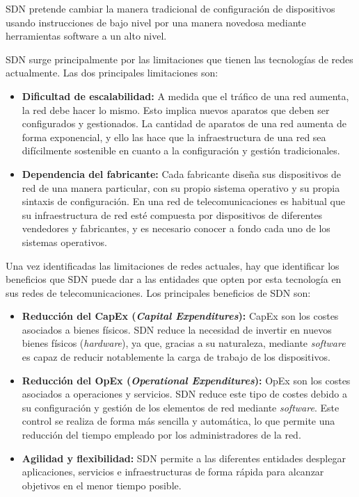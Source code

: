 SDN pretende cambiar la manera tradicional de configuración de dispositivos usando instrucciones de bajo nivel por una manera novedosa mediante herramientas software a un alto nivel.

SDN surge principalmente por las limitaciones que tienen las tecnologías de redes actualmente. Las dos principales limitaciones son:

\begin{itemize}
	\item \textbf{Dificultad de escalabilidad:} A medida que el tráfico de una red aumenta, la red debe hacer lo mismo. Esto implica nuevos aparatos que deben ser configurados y gestionados. La cantidad de aparatos de una red aumenta de forma exponencial, y ello las hace que la infraestructura de una red sea difícilmente sostenible en cuanto a la configuración y gestión tradicionales.
	
	\item \textbf{Dependencia del fabricante:} Cada fabricante diseña sus dispositivos de red de una manera particular, con su propio sistema operativo y su propia sintaxis de configuración. En una red de telecomunicaciones es habitual que su infraestructura de red esté compuesta por dispositivos de diferentes vendedores y fabricantes, y es necesario conocer a fondo cada uno de los sistemas operativos.
	
\end{itemize}

Una vez identificadas las limitaciones de redes actuales, hay que identificar los beneficios que SDN puede dar a las entidades que opten por esta tecnología en sus redes de telecomunicaciones. Los principales beneficios de SDN son:

\begin{itemize}
	\item \textbf{Reducción del CapEx (\textit{Capital Expenditures}):} CapEx son los costes asociados a bienes físicos. SDN reduce la necesidad de invertir en nuevos bienes físicos (\textit{hardware}), ya que, gracias a su naturaleza, mediante \textit{software} es capaz de reducir notablemente la carga de trabajo de los dispositivos.
	
	\item \textbf{Reducción del OpEx (\textit{Operational Expenditures}):} OpEx son los costes asociados a operaciones y servicios. SDN reduce este tipo de costes debido a su configuración y gestión de los elementos de red mediante \textit{software}. Este control se realiza de forma más sencilla y automática, lo que permite una reducción del tiempo empleado por los administradores de la red.
	
	\item \textbf{Agilidad y flexibilidad:} SDN permite a las diferentes entidades desplegar aplicaciones, servicios e infraestructuras de forma rápida para alcanzar objetivos en el menor tiempo posible.
\end{itemize}

